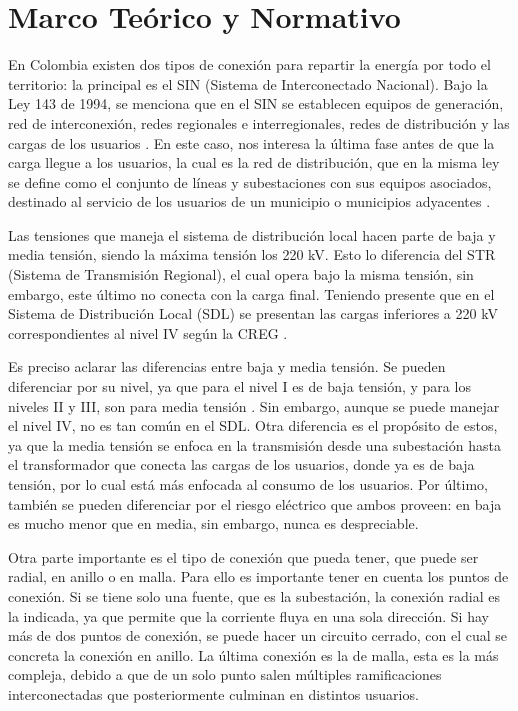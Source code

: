 \section{Marco Teórico y Normativo}

En Colombia existen dos tipos de conexión para repartir la energía por todo el territorio: la principal es el SIN (Sistema de Interconectado Nacional). Bajo la Ley 143 de 1994, se menciona que en el SIN se establecen equipos de generación, red de interconexión, redes regionales e interregionales, redes de distribución y las cargas de los usuarios \cite{ley143_1994}. En este caso, nos interesa la última fase antes de que la carga llegue a los usuarios, la cual es la red de distribución, que en la misma ley se define como el conjunto de líneas y subestaciones con sus equipos asociados, destinado al servicio de los usuarios de un municipio o municipios adyacentes \cite{ley143_1994}.

Las tensiones que maneja el sistema de distribución local hacen parte de baja y media tensión, siendo la máxima tensión los 220 kV. Esto lo diferencia del STR (Sistema de Transmisión Regional), el cual opera bajo la misma tensión, sin embargo, este último no conecta con la carga final. Teniendo presente que en el Sistema de Distribución Local (SDL) se presentan las cargas inferiores a 220 kV correspondientes al nivel IV según la CREG \cite{creg}.

Es preciso aclarar las diferencias entre baja y media tensión. Se pueden diferenciar por su nivel, ya que para el nivel I es de baja tensión, y para los niveles II y III, son para media tensión \cite{creg}. Sin embargo, aunque se puede manejar el nivel IV, no es tan común en el SDL. Otra diferencia es el propósito de estos, ya que la media tensión se enfoca en la transmisión desde una subestación hasta el transformador que conecta las cargas de los usuarios, donde ya es de baja tensión, por lo cual está más enfocada al consumo de los usuarios. Por último, también se pueden diferenciar por el riesgo eléctrico que ambos proveen: en baja es mucho menor que en media, sin embargo, nunca es despreciable.

Otra parte importante es el tipo de conexión que pueda tener, que puede ser radial, en anillo o en malla. Para ello es importante tener en cuenta los puntos de conexión. Si se tiene solo una fuente, que es la subestación, la conexión radial es la indicada, ya que permite que la corriente fluya en una sola dirección. Si hay más de dos puntos de conexión, se puede hacer un circuito cerrado, con el cual se concreta la conexión en anillo. La última conexión es la de malla, esta es la más compleja, debido a que de un solo punto salen múltiples ramificaciones interconectadas que posteriormente culminan en distintos usuarios.


